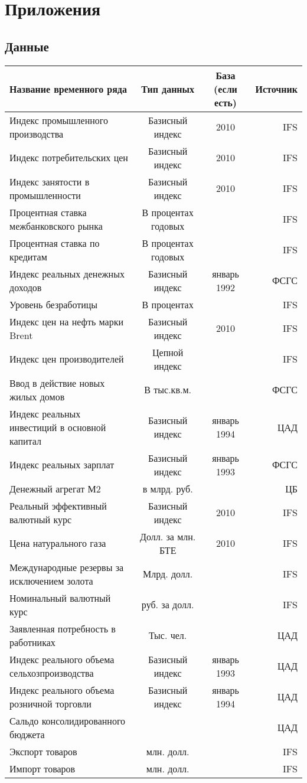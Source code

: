 \documentclass[11pt]{article} %
\begin{document}
\section*{Приложения}
\subsection*{Данные}
\begin{center}
\begin{table}[h!]
\begin{tabular}{lccr}
\toprule
Название временного ряда& Тип данных &  База (если есть) & Источник \\
\midrule
Индекс промышленного производства & Базисный индекс & 2010 & IFS \\
Индекс потребительских цен & Базисный индекс & 2010 & IFS \\
Индекс занятости в промышленности & Базисный индекс & 2010 & IFS \\
Процентная ставка межбанковского рынка & В процентах годовых &  & IFS \\
Процентная ставка по кредитам & В процентах годовых &  & IFS \\
Индекс реальных денежных доходов & Базисный индекс & январь 1992 & ФСГС\\
Уровень безработицы & В процентах &  & IFS \\
Индекс цен на нефть марки Brent & Базисный индекс & 2010 & IFS \\
Индекс цен производителей & Цепной индекс &  & IFS \\
Ввод в действие новых жилых домов & В тыс.кв.м. &  & ФСГС \\
Индекс реальных инвестиций в основной капитал& Базисный индекс & январь 1994 & ЦАД \\
Индекс реальных зарплат & Базисный индекс & январь 1993 & ФСГС \\
Денежный агрегат М2 & в млрд. руб.  &  & ЦБ \\
Реальный эффективный валютный курс & Базисный индекс & 2010 & IFS \\
Цена натурального газа & Долл. за млн. БТЕ & 2010 & IFS \\
Международные резервы за исключением золота & Млрд. долл. &  & IFS \\
Номинальный валютный курс & руб. за долл. &  & IFS \\
Заявленная потребность в работниках & Тыс. чел. &  & ЦАД \\
Индекс реального объема сельхозпроизводства & Базисный индекс & январь 1993 & ЦАД\\
Индекс реального объема розничной торговли & Базисный индекс & январь 1994 & ЦАД\\
Сальдо консолидированного бюджета &  &  & ЦАД \\
Экспорт товаров & млн. долл. &  & IFS \\
Импорт товаров & млн. долл. &  & IFS \\


\end{tabular}
\end{table}
\end{center}


\printbibliography
\end{document}
